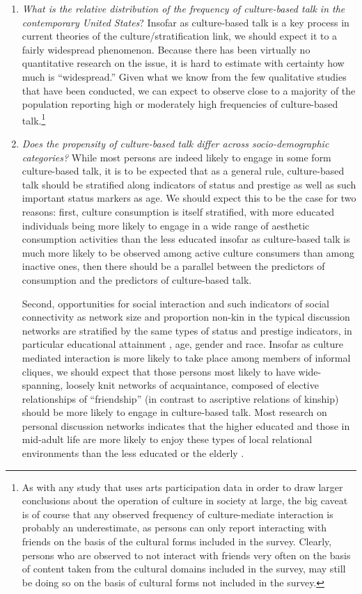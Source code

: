 \documentclass[11pt]{article}
\begin{document}
\begin{enumerate}
\item \emph{What is the relative distribution of the frequency of culture-based talk in the contemporary United States}? Insofar as culture-based talk is a key process in current theories of the culture/stratification link, we should expect it to a fairly widespread phenomenon.  Because there has been virtually no quantitative research on the issue, it is hard to estimate with certainty how much is ``widespread.''  Given what we know from the few qualitative studies that have been conducted, we can  expect to observe close to a majority of the population reporting high or moderately high frequencies of culture-based talk.\footnote{As with any study that uses arts participation data in order to draw larger conclusions about the operation of culture in society at large, the big caveat is of course that any observed frequency of culture-mediate interaction is probably an underestimate, as persons can only report interacting with friends on the basis of the cultural forms included in the survey.  Clearly, persons who are observed to not interact with friends very often on the basis of content taken from the cultural domains included in the survey, may still be doing so on the basis of cultural forms not included in the survey.}

\item \emph{Does the propensity of culture-based talk differ across socio-demographic categories?} While most persons are indeed likely to engage in some form culture-based talk, it is to be expected that as a general rule, culture-based talk should be stratified along indicators of status and prestige as well as such important status markers as age.  We should expect this to be the case for two reasons:  first, culture consumption is itself stratified, with more educated individuals being more likely to engage in a wide range of aesthetic consumption activities than the less educated \citep{bourdieu84, bourdieu_darbel91, vaneijck99} insofar as culture-based talk is much more likely to be observed among active culture consumers than among inactive ones, then there should be a parallel between the predictors of consumption and the predictors of culture-based talk.  

Second, opportunities for social interaction and such indicators of social connectivity as network size and proportion non-kin in the typical discussion networks are stratified by the same types of status and prestige indicators, in particular educational attainment \citep{marsden87, fischer82, burt90}, age, gender and race.  Insofar as culture mediated interaction is more likely to take place among members of informal cliques, we should expect that those persons most likely to have wide-spanning, loosely knit networks of acquaintance, composed of elective relationships of ``friendship'' (in contrast to ascriptive relations of kinship) should be more likely to engage in culture-based talk.  Most research on personal discussion networks indicates that the higher educated and those in mid-adult life are more likely to enjoy these types of local relational environments than the less educated or the elderly \citep{burt90, marsden87, erickson96, lizardo06a, fischer82}. 


\end{enumerate}
\end{document}
